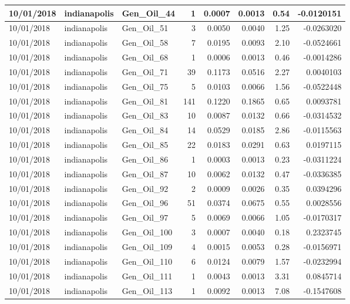 \documentclass[
  letterpaper,
  DIV=11,
  numbers=noendperiod]{scrartcl}
\begin{document}
\begin{tabular}{l|l|l|r|r|r|r|r}
\hline
10/01/2018 & indianapolis & Gen\_Oil\_44 & 1 & 0.0007 & 0.0013 & 0.54 & -0.0120151\\
\hline
10/01/2018 & indianapolis & Gen\_Oil\_51 & 3 & 0.0050 & 0.0040 & 1.25 & -0.0263020\\
\hline
10/01/2018 & indianapolis & Gen\_Oil\_58 & 7 & 0.0195 & 0.0093 & 2.10 & -0.0524661\\
\hline
10/01/2018 & indianapolis & Gen\_Oil\_68 & 1 & 0.0006 & 0.0013 & 0.46 & -0.0014286\\
\hline
10/01/2018 & indianapolis & Gen\_Oil\_71 & 39 & 0.1173 & 0.0516 & 2.27 & 0.0040103\\
\hline
10/01/2018 & indianapolis & Gen\_Oil\_75 & 5 & 0.0103 & 0.0066 & 1.56 & -0.0522448\\
\hline
10/01/2018 & indianapolis & Gen\_Oil\_81 & 141 & 0.1220 & 0.1865 & 0.65 & 0.0093781\\
\hline
10/01/2018 & indianapolis & Gen\_Oil\_83 & 10 & 0.0087 & 0.0132 & 0.66 & -0.0314532\\
\hline
10/01/2018 & indianapolis & Gen\_Oil\_84 & 14 & 0.0529 & 0.0185 & 2.86 & -0.0115563\\
\hline
10/01/2018 & indianapolis & Gen\_Oil\_85 & 22 & 0.0183 & 0.0291 & 0.63 & 0.0197115\\
\hline
10/01/2018 & indianapolis & Gen\_Oil\_86 & 1 & 0.0003 & 0.0013 & 0.23 & -0.0311224\\
\hline
10/01/2018 & indianapolis & Gen\_Oil\_87 & 10 & 0.0062 & 0.0132 & 0.47 & -0.0336385\\
\hline
10/01/2018 & indianapolis & Gen\_Oil\_92 & 2 & 0.0009 & 0.0026 & 0.35 & 0.0394296\\
\hline
10/01/2018 & indianapolis & Gen\_Oil\_96 & 51 & 0.0374 & 0.0675 & 0.55 & 0.0028556\\
\hline
10/01/2018 & indianapolis & Gen\_Oil\_97 & 5 & 0.0069 & 0.0066 & 1.05 & -0.0170317\\
\hline
10/01/2018 & indianapolis & Gen\_Oil\_100 & 3 & 0.0007 & 0.0040 & 0.18 & 0.2323745\\
\hline
10/01/2018 & indianapolis & Gen\_Oil\_109 & 4 & 0.0015 & 0.0053 & 0.28 & -0.0156971\\
\hline
10/01/2018 & indianapolis & Gen\_Oil\_110 & 6 & 0.0124 & 0.0079 & 1.57 & -0.0232994\\
\hline
10/01/2018 & indianapolis & Gen\_Oil\_111 & 1 & 0.0043 & 0.0013 & 3.31 & 0.0845714\\
\hline
10/01/2018 & indianapolis & Gen\_Oil\_113 & 1 & 0.0092 & 0.0013 & 7.08 & -0.1547608\\

\end{tabular}
\end{document}
